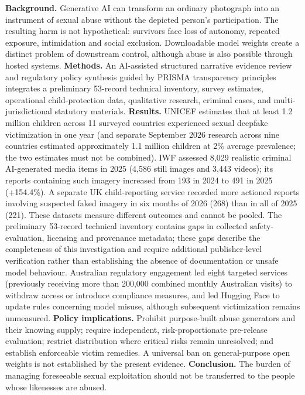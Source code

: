 \documentclass[10pt,a4paper]{article}
\begin{document}
\textbf{Background.} Generative AI can transform an ordinary photograph into an instrument of sexual abuse without the depicted person's participation. The resulting harm is not hypothetical: survivors face loss of autonomy, repeated exposure, intimidation and social exclusion. Downloadable model weights create a distinct problem of downstream control, although abuse is also possible through hosted systems. \textbf{Methods.} An AI-assisted structured narrative evidence review and regulatory policy synthesis guided by PRISMA transparency principles integrates a preliminary 53-record technical inventory, survey estimates, operational child-protection data, qualitative research, criminal cases, and multi-jurisdictional statutory materials. \textbf{Results.} UNICEF estimates that at least 1.2 million children across 11 surveyed countries experienced sexual deepfake victimization in one year (and separate September 2026 research across nine countries estimated approximately 1.1 million children at 2\% average prevalence; the two estimates must not be combined). IWF assessed 8,029 realistic criminal AI-generated media items in 2025 (4,586 still images and 3,443 videos); its reports containing such imagery increased from 193 in 2024 to 491 in 2025 (+154.4\%). A separate UK child-reporting service recorded more actioned reports involving suspected faked imagery in six months of 2026 (268) than in all of 2025 (221). These datasets measure different outcomes and cannot be pooled. The preliminary 53-record technical inventory contains gaps in collected safety-evaluation, licensing and provenance metadata; these gaps describe the completeness of this investigation and require additional publisher-level verification rather than establishing the absence of documentation or unsafe model behaviour. Australian regulatory engagement led eight targeted services (previously receiving more than 200,000 combined monthly Australian visits) to withdraw access or introduce compliance measures, and led Hugging Face to update rules concerning model misuse, although subsequent victimization remains unmeasured. \cite{ausmodels,ausbill} \textbf{Policy implications.} Prohibit purpose-built abuse generators and their knowing supply; require independent, risk-proportionate pre-release evaluation; restrict distribution where critical risks remain unresolved; and establish enforceable victim remedies. A universal ban on general-purpose open weights is not established by the present evidence. \textbf{Conclusion.} The burden of managing foreseeable sexual exploitation should not be transferred to the people whose likenesses are abused. \cite{iwf,unicef12,reportremove,deepfakeimpact,uknotes,ntia}
\end{document}
